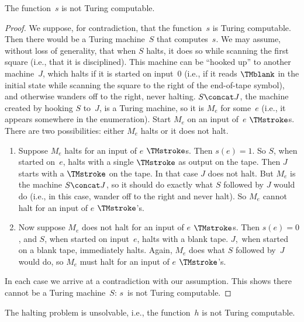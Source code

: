 \documentclass[../../../include/open-logic-section]{subfiles}
\begin{document}
\begin{lem}
The function~$s$ is not Turing computable.
\end{lem}

\begin{proof}
We suppose, for contradiction, that the function~$s$ is Turing
computable.  Then there would be a Turing machine~$S$ that
computes~$s$. We may assume, without loss of generality, that when $S$
halts, it does so while scanning the first square (i.e., that it is
disciplined).  This machine can be ``hooked up'' to another
machine~$J$, which halts if it is started on input~$0$ (i.e., if it
reads $\TMblank$ in the initial state while scanning the square to the
right of the end-of-tape symbol), and otherwise wanders off to the
right, never halting. $S \concat J$, the machine created by hooking
$S$ to~$J$, is a Turing machine, so it is $M_e$ for some~$e$ (i.e., it
appears somewhere in the enumeration). Start $M_e$ on an input of~$e$
$\TMstroke$s. There are two possibilities: either $M_e$ halts or it
does not halt.
\begin{enumerate}
\item Suppose $M_e$ halts for an input of $e$ $\TMstroke$s. Then $s(e)
  = 1$. So $S$, when started on~$e$, halts with a single $\TMstroke$
  as output on the tape.  Then $J$ starts with a $\TMstroke$ on the
  tape. In that case $J$ does not halt. But $M_e$ is the machine $S
  \concat J$, so it should do exactly what $S$ followed by $J$ would
  do (i.e., in this case, wander off to the right and never halt).  So
  $M_e$ cannot halt for an input of $e$ $\TMstroke$'s.

\item Now suppose $M_e$ does not halt for an input of $e$
  $\TMstroke$s.  Then $s(e) = 0$, and $S$, when started on input~$e$,
  halts with a blank tape.  $J$,~when started on a blank tape,
  immediately halts.  Again, $M_e$ does what $S$ followed by~$J$ would
  do, so $M_e$ must halt for an input of $e$ $\TMstroke$'s.
\end{enumerate}
In each case we arrive at a contradiction with our assumption. This
shows there cannot be a Turing machine~$S$: $s$~is not Turing
computable.
\end{proof}

\begin{thm}
 The halting problem is unsolvable, i.e.,
the function~$h$ is not Turing computable.
\end{thm}
\end{document}
